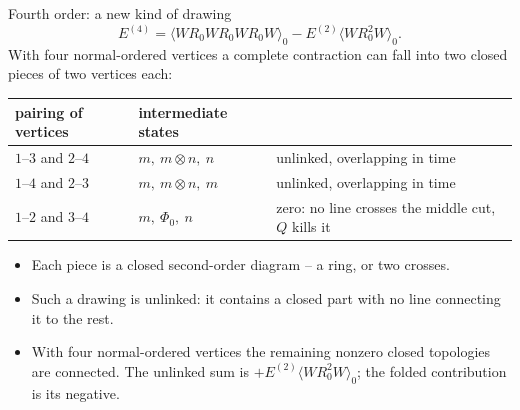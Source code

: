 \documentclass[aspectratio=169,10pt]{beamer}
\newcommand{\av}[1]{\langle #1\rangle_0}
\newcommand{\ph}{\Phi_0}
\begin{document}
\begin{frame}{Fourth order: a new kind of drawing}
\[
E^{(4)}=\av{WR_0WR_0WR_0W}-E^{(2)}\av{WR_0^2W}.
\]
With four normal-ordered vertices a complete contraction can fall into \alert{two closed pieces of two vertices each}:
\begin{center}
\begin{tabular}{lll}
\toprule
pairing of vertices & intermediate states & \\
\midrule
\(1\)--\(3\) and \(2\)--\(4\) & \(m,\ m\otimes n,\ n\) & unlinked, overlapping in time\\
\(1\)--\(4\) and \(2\)--\(3\) & \(m,\ m\otimes n,\ m\) & unlinked, overlapping in time\\
\(1\)--\(2\) and \(3\)--\(4\) & \(m,\ \ph,\ n\) & \alert{zero}: no line crosses the middle cut, \(Q\) kills it\\
\bottomrule
\end{tabular}
\end{center}
\begin{itemize}
\item Each piece is a closed second-order diagram -- a ring, or two crosses.
\item Such a drawing is \alert{unlinked}: it contains a closed part with no line connecting it to the rest.
\item With four normal-ordered vertices the remaining nonzero closed topologies are connected. The unlinked sum is $+E^{(2)}\av{WR_0^2W}$; the folded contribution is its negative.
\end{itemize}
\end{frame}
\end{document}
